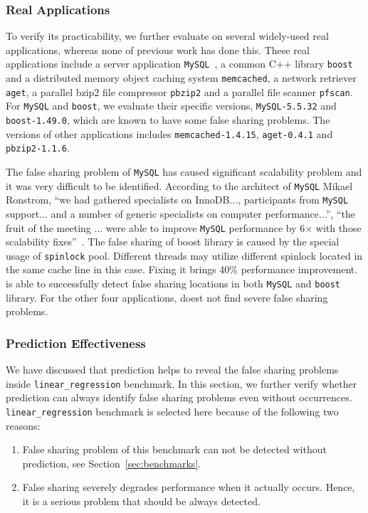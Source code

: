 \subsubsection{Real Applications}
To verify its practicability, we further evaluate \Predator{} 
on several widely-used real applications, whereas none of previous work has done this.  
These real applications include a server application \texttt{MySQL}~\cite{mysql}, 
a common C++ library \texttt{boost}~\cite{libfalsesharing} 
and a distributed memory object caching system \texttt{memcached}, a network retriever \texttt{aget}, 
a parallel bzip2 file compressor \texttt{pbzip2} and a parallel file scanner \texttt{pfscan}.
For \texttt{MySQL} and \texttt{boost},
we evaluate their specific versions, \texttt{MySQL-5.5.32} and
\texttt{boost-1.49.0}, which are known to have some false sharing problems.
The versions of other applications includes \texttt{memcached-1.4.15},
\texttt{aget-0.4.1} and \texttt{pbzip2-1.1.6}.

The false sharing problem of \texttt{MySQL} has caused significant scalability problem and
it was very difficult to be identified. 
According to the architect of \texttt{MySQL} Mikael Ronstrom, ``we had gathered specialists on 
InnoDB..., participants from \texttt{MySQL} support... and a number of generic specialists on 
computer performance...'', ``the fruit of the meeting ... were able to 
improve \texttt{MySQL} performance by 6$\times$ with those scalability fixes''~\cite{mysql}. 
The false sharing of boost library is caused by the special usage of \texttt{spinlock} pool.
Different threads may utilize different spinlock located in the same cache line in this case.
Fixing it brings 40\% performance improvement. 
\Predator{} is able to successfully detect false sharing locations
in both \texttt{MySQL} and \texttt{boost} library. 
For the other four applications, \Predator{} doest not find severe false sharing problems.

\subsubsection{Prediction Effectiveness}
\label{sec:predicteval}
We have discussed that prediction helps to reveal the false sharing problems inside \texttt{linear\_regression} benchmark. In this section, we further verify whether prediction can always identify 
false sharing problems even without occurrences.
\texttt{linear\_regression} benchmark is selected here because of the following two reasons:
\begin{enumerate}
\item
False sharing problem of this benchmark can not be detected without prediction, see Section~\ref{sec:benchmarks}. 

\item
False sharing severely degrades performance when it actually occurs. 
Hence, it is a serious problem that should be always detected. 
\end{enumerate}

